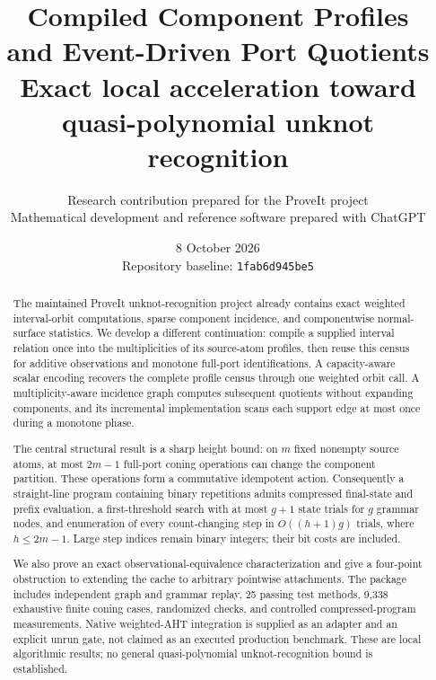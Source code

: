 \documentclass[11pt,letterpaper]{article}
\title{\textbf{Compiled Component Profiles\protect\\and Event-Driven Port Quotients}\\[7pt]
\large Exact local acceleration toward quasi-polynomial unknot recognition}
\author{Research contribution prepared for the ProveIt project\\
\small Mathematical development and reference software prepared with ChatGPT}
\date{8 October 2026\\[4pt]\small Repository baseline: \texttt{1fab6d945be5}}
\theoremstyle{definition}
\begin{document}
\maketitle
\begin{abstract}
The maintained ProveIt unknot-recognition project already contains exact
weighted interval-orbit computations, sparse component incidence, and
componentwise normal-surface statistics. We develop a different continuation:
compile a supplied interval relation once into the multiplicities of its
source-atom profiles, then reuse this census for additive observations and
monotone full-port identifications. A capacity-aware scalar encoding recovers
the complete profile census through one weighted orbit call. A
multiplicity-aware incidence graph computes subsequent quotients without
expanding components, and its incremental implementation scans each support
edge at most once during a monotone phase.

The central structural result is a sharp height bound: on $m$ fixed nonempty
source atoms, at most $2m-1$ full-port coning operations can change the
component partition. These operations form a commutative idempotent action.
Consequently a straight-line program containing binary repetitions admits
compressed final-state and prefix evaluation, a first-threshold search with
at most $g+1$ state trials for $g$ grammar nodes, and enumeration of every
count-changing step in $O((h+1)g)$ trials, where $h\le 2m-1$. Large step indices
remain binary integers; their bit costs are included.

We also prove an exact observational-equivalence characterization and give
a four-point obstruction to extending the cache to arbitrary pointwise
attachments. The package includes independent graph and grammar replay,
25 passing test methods, 9,338 exhaustive finite coning cases, randomized
checks, and controlled compressed-program measurements. Native weighted-AHT
integration is supplied as an adapter and an explicit unrun gate, not claimed
as an executed production benchmark. These are local algorithmic results;
no general quasi-polynomial unknot-recognition bound is established.
\end{abstract}
\clearpage
\setcounter{tocdepth}{1}
\tableofcontents
\clearpage








\appendix


\end{document}
